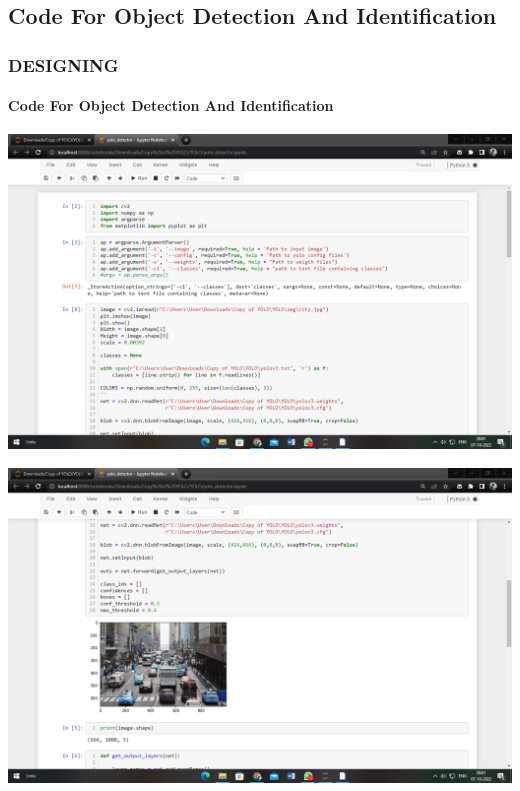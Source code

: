 \documentclass[
	11pt, %
	aspectratio=169, %
]{beamer}
\begin{document}
\subsection{Code For Object Detection And Identification}
\begin{frame}
	\frametitle{DESIGNING}
	\framesubtitle{Code For Object Detection And Identification}
	\begin{center}
	\begin{minipage}{0.30\textwidth}
		\includegraphics[width=\textwidth]{Screenshot (3).png}
	\end{minipage}\hfill
	\begin{minipage}{0.30\textwidth}
	\includegraphics[width=\textwidth]{Screenshot (4).png}
\end{minipage}\hfill
	\begin{minipage}{0.30\textwidth}

\end{minipage}
\end{center}
\end{frame}
\end{document}
